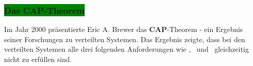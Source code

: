 \subsubsection{\colorbox{green}{Das CAP-Theorem}}\label{cap}

Im Jahr 2000 präsentierte Eric A. Brewer das \textbf{CAP}-Theorem - ein Ergebnis seiner Forschungen zu verteilten Systemen. Das Ergebnis zeigte, dass bei den verteilten Systemen alle drei folgenden Anforderungen wie \Cap, \cAp\ und \caP\ gleichzeitig nicht zu erfüllen sind.
